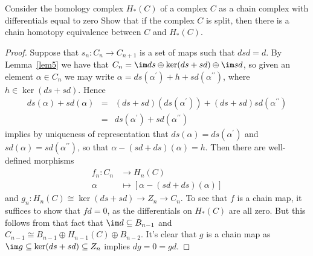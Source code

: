 \documentclass[10pt]{amsart}
\begin{document}
\begin{ex}\label{Ex2}
  Consider the homology complex $H_*(C)$ of a complex $C$ as a chain complex with differentials equal to zero
  Show that if the complex $C$ is split, then there is a chain homotopy equivalence between $C$ and $H_*(C)$.

  \begin{proof}
    Suppose that $s_n : C_n \rightarrow C_{n+1}$ is a set of maps such that $dsd = d$.
    By Lemma~\ref{lem5} we have that $C_n = \im ds \oplus \ker (ds + sd) \oplus \im sd$, so given an element $\alpha \in C_n$ we may write $\alpha = ds(\alpha^\prime) + h + sd(\alpha^{\prime\prime})$, where $h \in \ker (ds + sd)$.
    Hence
    \begin{eqnarray*}
      ds(\alpha) + sd(\alpha) &=& (ds + sd)(ds(\alpha^\prime)) + (ds + sd) sd(\alpha^{\prime\prime})\\
      &=& ds(\alpha^\prime) + sd(\alpha^{\prime\prime})
    \end{eqnarray*}
    implies by uniqueness of representation that $ds(\alpha) = ds(\alpha^\prime)$ and $sd(\alpha) = sd(\alpha^{\prime\prime})$, so that $\alpha - (sd + ds)(\alpha) = h$.
    Then there are well-defined morphisms
    \begin{align*}
      f_n \colon C_n &\rightarrow H_n(C)\\
      \alpha &\mapsto [\alpha - (sd + ds)(\alpha)]
    \end{align*}
    and
    $g_n : H_n(C) \cong \ker (ds + sd) \rightarrow Z_n \rightarrow C_n$.
    To see that $f$ is a chain map, it suffices to show that $fd = 0$, as the differentials on $H_*(C)$ are all zero.
    But this follows from that fact that $\im d \subseteq B_{n-1}$ and $C_{n-1} \cong B_{n-1} \oplus H_{n-1}(C) \oplus B_{n-2}$.
    It's clear that $g$ is a chain map as $\im g \subseteq \ker (ds + sd) \subseteq Z_n$ implies $dg = 0 = gd$.


\end{proof}
\end{ex}
\end{document}
